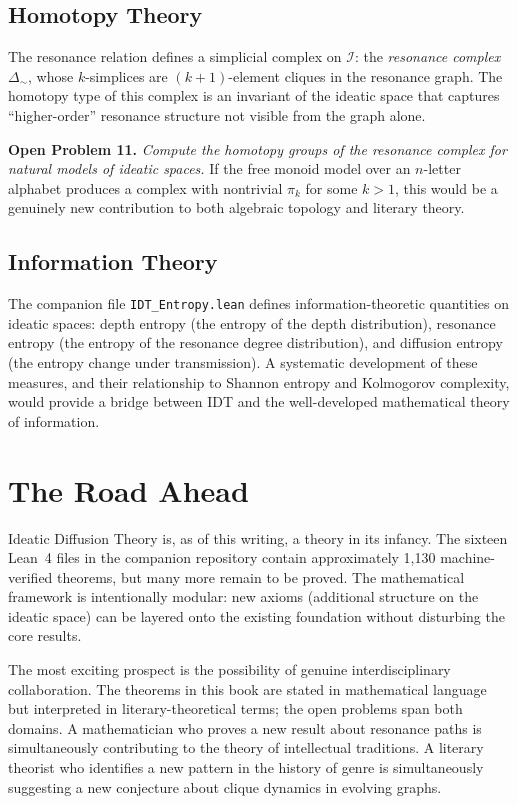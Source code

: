 \documentclass[11pt,openany]{book}
\theoremstyle{definition}
\theoremstyle{plain}
\theoremstyle{remark}
\newcommand{\IS}{\mathcal{I}}               %
\newcommand{\res}{\sim}                      %
\begin{document}
\subsection{Homotopy Theory}

The resonance relation defines a simplicial complex on $\IS$: the \emph{resonance complex} $\Delta_{\res}$, whose $k$-simplices are $(k+1)$-element cliques in the resonance graph. The homotopy type of this complex is an invariant of the ideatic space that captures ``higher-order'' resonance structure not visible from the graph alone.

\textbf{Open Problem 11.} \emph{Compute the homotopy groups of the resonance complex for natural models of ideatic spaces.} If the free monoid model over an $n$-letter alphabet produces a complex with nontrivial $\pi_k$ for some $k > 1$, this would be a genuinely new contribution to both algebraic topology and literary theory.

\subsection{Information Theory}

The companion file \texttt{IDT\_Entropy.lean} defines information-theoretic quantities on ideatic spaces: depth entropy (the entropy of the depth distribution), resonance entropy (the entropy of the resonance degree distribution), and diffusion entropy (the entropy change under transmission). A systematic development of these measures, and their relationship to Shannon entropy and Kolmogorov complexity, would provide a bridge between IDT and the well-developed mathematical theory of information.

\section{The Road Ahead}

Ideatic Diffusion Theory is, as of this writing, a theory in its infancy. The sixteen Lean~4 files in the companion repository contain approximately 1,130 machine-verified theorems, but many more remain to be proved. The mathematical framework is intentionally modular: new axioms (additional structure on the ideatic space) can be layered onto the existing foundation without disturbing the core results.

The most exciting prospect is the possibility of genuine interdisciplinary collaboration. The theorems in this book are stated in mathematical language but interpreted in literary-theoretical terms; the open problems span both domains. A mathematician who proves a new result about resonance paths is simultaneously contributing to the theory of intellectual traditions. A literary theorist who identifies a new pattern in the history of genre is simultaneously suggesting a new conjecture about clique dynamics in evolving graphs.
\end{document}
